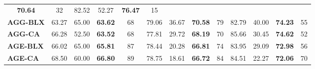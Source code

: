 \begin{table}[H]
{\begin{tabular}{lcccccccccccc}
			\multicolumn{1}{c|}{{\color[HTML]{333333} \textbf{70.64}}} &
			\multicolumn{1}{c|}{32} &
			\multicolumn{1}{c|}{82.52} &
			\multicolumn{1}{c|}{52.27} &
			\multicolumn{1}{c|}{{\color[HTML]{333333} \textbf{76.47}}} &
			\multicolumn{1}{c|}{15} \\ \cline{2-13} 
			\multicolumn{1}{l|}{\cellcolor[HTML]{D9D9D9}\textbf{AGG-BLX}} &
			\multicolumn{1}{c|}{63.27} &
			\multicolumn{1}{c|}{65.00} &
			\multicolumn{1}{c|}{{\color[HTML]{333333} \textbf{63.62}}} &
			\multicolumn{1}{c|}{68} &
			\multicolumn{1}{c|}{79.06} &
			\multicolumn{1}{c|}{36.67} &
			\multicolumn{1}{c|}{{\color[HTML]{333333} \textbf{70.58}}} &
			\multicolumn{1}{c|}{79} &
			\multicolumn{1}{c|}{82.79} &
			\multicolumn{1}{c|}{40.00} &
			\multicolumn{1}{c|}{{\color[HTML]{333333} \textbf{74.23}}} &
			\multicolumn{1}{c|}{55} \\ \cline{2-13} 
			\multicolumn{1}{l|}{\cellcolor[HTML]{D9D9D9}\textbf{AGG-CA}} &
			\multicolumn{1}{c|}{66.28} &
			\multicolumn{1}{c|}{52.50} &
			\multicolumn{1}{c|}{{\color[HTML]{333333} \textbf{63.52}}} &
			\multicolumn{1}{c|}{68} &
			\multicolumn{1}{c|}{77.81} &
			\multicolumn{1}{c|}{29.72} &
			\multicolumn{1}{c|}{{\color[HTML]{333333} \textbf{68.19}}} &
			\multicolumn{1}{c|}{70} &
			\multicolumn{1}{c|}{85.66} &
			\multicolumn{1}{c|}{30.45} &
			\multicolumn{1}{c|}{{\color[HTML]{333333} \textbf{74.62}}} &
			\multicolumn{1}{c|}{52} \\ \cline{2-13} 
			\multicolumn{1}{l|}{\cellcolor[HTML]{D9D9D9}\textbf{AGE-BLX}} &
			\multicolumn{1}{c|}{66.02} &
			\multicolumn{1}{c|}{65.00} &
			\multicolumn{1}{c|}{{\color[HTML]{333333} \textbf{65.81}}} &
			\multicolumn{1}{c|}{87} &
			\multicolumn{1}{c|}{78.44} &
			\multicolumn{1}{c|}{20.28} &
			\multicolumn{1}{c|}{{\color[HTML]{333333} \textbf{66.81}}} &
			\multicolumn{1}{c|}{74} &
			\multicolumn{1}{c|}{83.95} &
			\multicolumn{1}{c|}{29.09} &
			\multicolumn{1}{c|}{{\color[HTML]{333333} \textbf{72.98}}} &
			\multicolumn{1}{c|}{56} \\ \cline{2-13} 
			\multicolumn{1}{l|}{\cellcolor[HTML]{D9D9D9}\textbf{AGE-CA}} &
			\multicolumn{1}{c|}{68.50} &
			\multicolumn{1}{c|}{60.00} &
			\multicolumn{1}{c|}{{\color[HTML]{333333} \textbf{66.80}}} &
			\multicolumn{1}{c|}{89} &
			\multicolumn{1}{c|}{78.75} &
			\multicolumn{1}{c|}{18.61} &
			\multicolumn{1}{c|}{{\color[HTML]{333333} \textbf{66.72}}} &
			\multicolumn{1}{c|}{84} &
			\multicolumn{1}{c|}{84.51} &
			\multicolumn{1}{c|}{22.27} &
			\multicolumn{1}{c|}{{\color[HTML]{333333} \textbf{72.06}}} &
			\multicolumn{1}{c|}{70} \\ \cline{2-13} 

\end{tabular}}
\end{table}
